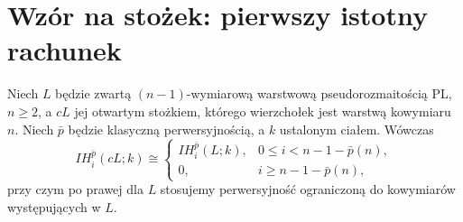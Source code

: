 \section{Wzór na stożek: pierwszy istotny rachunek}
\begin{twierdzenie}
\label{thm:cone-ih-xiii}
Niech $L$ będzie zwartą $(n-1)$-wymiarową
warstwową pseudorozmaitością PL, $n\ge2$, a $cL$
jej otwartym stożkiem, którego wierzchołek jest
warstwą kowymiaru $n$. Niech $\bar p$ będzie klasyczną
perwersyjnością, a $k$ ustalonym ciałem. Wówczas
\[
IH_i^{\bar p}(cL;k)\cong
\begin{cases}
IH_i^{\bar p}(L;k),&0\le i<n-1-\bar p(n),\\
0,&i\ge n-1-\bar p(n),
\end{cases}
\]
przy czym po prawej dla $L$ stosujemy perwersyjność
ograniczoną do kowymiarów występujących w $L$.
\end{twierdzenie}
